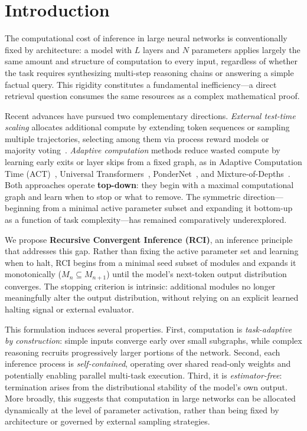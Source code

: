 \documentclass{article}
\begin{document}
\section{Introduction}
\label{sec:intro}

The computational cost of inference in large neural networks is
conventionally fixed by architecture: a model with $L$ layers and
$N$ parameters applies largely the same amount and structure of
computation to every input, regardless of whether the task
requires synthesizing multi-step reasoning chains or answering a
simple factual query.
This rigidity constitutes a fundamental inefficiency---a direct
retrieval question consumes the same resources as a complex
mathematical proof.

Recent advances have pursued two complementary directions.
\textit{External test-time scaling} allocates additional compute
by extending token sequences or sampling multiple trajectories,
selecting among them via process reward models or majority
voting~\citep{snell2024scaling, muennighoff2025s1}.
\textit{Adaptive computation} methods reduce wasted compute by
learning early exits or layer skips from a fixed graph, as in
Adaptive Computation Time (ACT)~\citep{graves2016act},
Universal Transformers~\citep{dehghani2019universal},
PonderNet~\citep{banino2021pondernet}, and
Mixture-of-Depths~\citep{raposo2024mod}.
Both approaches operate \textbf{top-down}: they begin with a
maximal computational graph and learn when to stop or what to
remove.
The symmetric direction---beginning from a minimal active
parameter subset and expanding it bottom-up as a function of
task complexity---has remained comparatively underexplored.

We propose \textbf{Recursive Convergent Inference (RCI)}, an
inference principle that addresses this gap.
Rather than fixing the active parameter set and learning when to
halt, RCI begins from a minimal seed subset of modules and expands
it monotonically ($M_n \subseteq M_{n+1}$) until the model's
next-token output distribution converges.
The stopping criterion is intrinsic: additional modules no longer
meaningfully alter the output distribution, without relying on an
explicit learned halting signal or external evaluator.

This formulation induces several properties.
First, computation is \textit{task-adaptive by construction}:
simple inputs converge early over small subgraphs, while complex
reasoning recruits progressively larger portions of the network.
Second, each inference process is \textit{self-contained},
operating over shared read-only weights and potentially enabling
parallel multi-task execution.
Third, it is \textit{estimator-free}: termination arises from the
distributional stability of the model's own output.
More broadly, this suggests that computation in large networks can
be allocated dynamically at the level of parameter activation,
rather than being fixed by architecture or governed by external
sampling strategies.
\end{document}
